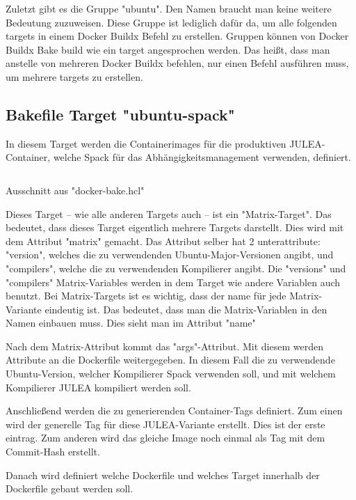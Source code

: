 Zuletzt gibt es die Gruppe "ubuntu". Den Namen braucht man keine weitere Bedeutung zuzuweisen. Diese Gruppe ist lediglich dafür da, um alle folgenden targets in einem Docker Buildx Befehl zu erstellen. Gruppen können von Docker Buildx Bake build wie ein target angesprochen werden. Das heißt, dass man anstelle von mehreren Docker Buildx befehlen, nur einen Befehl ausführen muss, um mehrere targets zu erstellen.

\subsection{Bakefile Target "ubuntu-spack"} \label{ubuntu-spack-target}

In diesem Target werden die Containerimages für die produktiven JULEA-Container, welche Spack für das Abhängigkeitsmanagement verwenden, definiert.

\begin{listing}[H]
    \inputminted[firstline=9,lastline=33]{./lexers/docker-bake-lexer.py}{./code-examples/docker-bake.hcl}
    \caption{Ausschnitt aus "docker-bake.hcl"}
\end{listing}


Dieses Target – wie alle anderen Targets auch – ist ein "Matrix-Target". Das bedeutet, dass dieses Target eigentlich mehrere Targets darstellt. Dies wird mit dem Attribut "matrix" gemacht. Das Attribut selber hat 2 unterattribute: "version", welches die zu verwendenden Ubuntu-Major-Versionen angibt, und "compilers", welche die zu verwendenden Kompilierer angibt.
Die "versions" und "compilers" Matrix-Variables werden in dem Target wie andere Variablen auch benutzt. 
Bei Matrix-Targets ist es wichtig, dass der name für jede Matrix-Variante eindeutig ist. Das bedeutet, dass man die Matrix-Variablen in den Namen einbauen muss. Dies sieht man im Attribut "name"

Nach dem Matrix-Attribut kommt das "args"-Attribut. Mit diesem werden Attribute an die Dockerfile weitergegeben. In diesem Fall die zu verwendende Ubuntu-Version, welcher Kompilierer Spack verwenden soll, und mit welchem Kompilierer JULEA kompiliert werden soll. 

Anschließend werden die zu generierenden Container-Tags definiert. Zum einen wird der generelle Tag für diese JULEA-Variante erstellt. Dies ist der erste eintrag. Zum anderen wird das gleiche Image noch einmal als Tag mit dem Commit-Hash erstellt.

Danach wird definiert welche Dockerfile und welches Target innerhalb der Dockerfile gebaut werden soll. 


